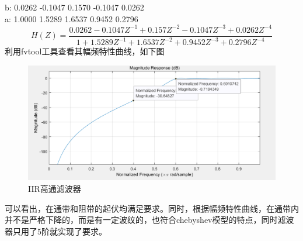 \documentclass[UTF8]{ctexart}
\begin{document}
b:  0.0262   -0.1047    0.1570   -0.1047    0.0262 \\
\hspace*{2em}a:  1.0000    1.5289    1.6537    0.9452    0.2796\\
\[
H(Z)=\frac{0.0262-0.1047Z^{-1}+0.157Z^{-2}-0.1047Z^{-3}+0.0262Z^{-4}}{1+1.5289Z^{-1}+1.6537Z^{-2}+0.9452Z^{-3}+0.2796Z^{-4}}
\]
利用fvtool工具查看其幅频特性曲线，如下图
\begin{figure}[H]
	\centering
	\includegraphics[scale=0.8]{figs/iir1}
	\caption{IIR高通滤波器}
\end{figure}
可以看出，在通带和阻带的起伏均满足要求。同时，根据幅频特性曲线，在通带内并不是严格下降的，而是有一定波纹的，也符合chebyshev模型的特点，同时滤波器只用了5阶就实现了要求。
\end{document}
